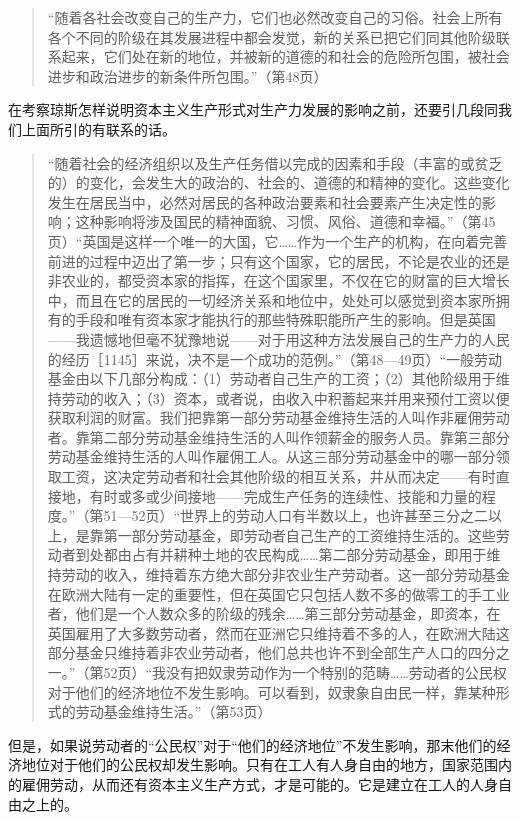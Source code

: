 \begin{quote}{“随着各社会改变自己的生产力，它们也必然改变自己的习俗。社会上所有各个不同的阶级在其发展进程中都会发觉，新的关系已把它们同其他阶级联系起来，它们处在新的地位，并被新的道德的和社会的危险所包围，被社会进步和政治进步的新条件所包围。”（第48页）}\end{quote}

在考察琼斯怎样说明资本主义生产形式对生产力发展的影响之前，还要引几段同我们上面所引的有联系的话。

\begin{quote}{“随着社会的经济组织以及生产任务借以完成的因素和手段（丰富的或贫乏的）的变化，会发生大的政治的、社会的、道德的和精神的变化。这些变化发生在居民当中，必然对居民的各种政治要素和社会要素产生决定性的影响；这种影响将涉及国民的精神面貌、习惯、风俗、道德和幸福。”（第45页）“英国是这样一个唯一的大国，它……作为一个生产的机构，在向着完善前进的过程中迈出了第一步；只有这个国家，它的居民，不论是农业的还是非农业的，都受资本家的指挥，在这个国家里，不仅在它的财富的巨大增长中，而且在它的居民的一切经济关系和地位中，处处可以感觉到资本家所拥有的手段和唯有资本家才能执行的那些特殊职能所产生的影响。但是英国——我遗憾地但毫不犹豫地说——对于用这种方法发展自己的生产力的人民的经历［1145］来说，决不是一个成功的范例。”（第48—49页）“一般劳动基金由以下几部分构成：（1）劳动者自己生产的工资；（2）其他阶级用于维持劳动的收入；（3）资本，或者说，由收入中积蓄起来并用来预付工资以便获取利润的财富。我们把靠第一部分劳动基金维持生活的人叫作非雇佣劳动者。靠第二部分劳动基金维持生活的人叫作领薪金的服务人员。靠第三部分劳动基金维持生活的人叫作雇佣工人。从这三部分劳动基金中的哪一部分领取工资，这决定劳动者和社会其他阶级的相互关系，并从而决定——有时直接地，有时或多或少间接地——完成生产任务的连续性、技能和力量的程度。”（第51—52页）“世界上的劳动人口有半数以上，也许甚至三分之二以上，是靠第一部分劳动基金，即劳动者自己生产的工资维持生活的。这些劳动者到处都由占有并耕种土地的农民构成……第二部分劳动基金，即用于维持劳动的收入，维持着东方绝大部分非农业生产劳动者。这一部分劳动基金在欧洲大陆有一定的重要性，但在英国它只包括人数不多的做零工的手工业者，他们是一个人数众多的阶级的残余……第三部分劳动基金，即资本，在英国雇用了大多数劳动者，然而在亚洲它只维持着不多的人，在欧洲大陆这部分基金只维持着非农业劳动者，他们总共也许不到全部生产人口的四分之一。”（第52页）“我没有把奴隶劳动作为一个特别的范畴……劳动者的公民权对于他们的经济地位不发生影响。可以看到，奴隶象自由民一样，靠某种形式的劳动基金维持生活。”（第53页）}\end{quote}

但是，如果说劳动者的“公民权”对于“他们的经济地位”不发生影响，那末他们的经济地位对于他们的公民权却发生影响。只有在工人有人身自由的地方，国家范围内的雇佣劳动，从而还有资本主义生产方式，才是可能的。它是建立在工人的人身自由之上的。

